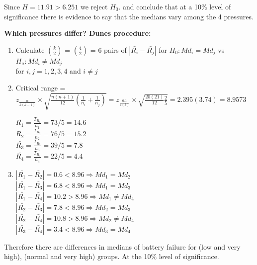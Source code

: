 \documentclass{article}
\begin{document}
\begin{enumerate}[1.]
Since $H = 11.91 > 6.251$ we reject $H_0$. and conclude that at a 10\% level of significance there is evidence to say that the medians vary among the 4 pressures.

\textbf{Which pressures differ? Dunes procedure:}

\begin{enumerate}[1)]
\item
Calculate $k \choose 2$ = $4 \choose 2$ = 6 pairs of $|\bar{R_i} - \bar{R_j}|$ for $H_0: Md_i = Md_j$ vs $H_a: Md_i \neq Md_j$ \\
for $i,j = 1,2,3,4$ and $i \neq j$

\item 
Critical range = $z_{\frac{\alpha}{k(k-1)}} \times \sqrt{ \frac{n(n+1)}{12}( \frac{1}{n_i} + \frac{1}{n_j} )} = z_{\frac{0.1}{4(3)}} \times \sqrt{ \frac{20(21)}{12}\frac{2}{5}} = 2.395(3.74) = 8.9573$

$\bar{R_1} = \frac{T_{R_1}}{n_1} = 73/5 = 14.6$ \\
$\bar{R_2} = \frac{T_{R_2}}{n_2} = 76/5 = 15.2$ \\
$\bar{R_3} = \frac{T_{R_3}}{n_3} = 39/5 = 7.8$ \\ 
$\bar{R_4} = \frac{T_{R_4}}{n_4} = 22/5 = 4.4$\\ 

\item
$|\bar{R_1} - \bar{R_2}| = 0.6 < 8.96 \Rightarrow Md_1 = Md_2$ \\
$|\bar{R_1} - \bar{R_3}| = 6.8 < 8.96 \Rightarrow Md_1 = Md_3$ \\
$|\bar{R_1} - \bar{R_4}| = 10.2 > 8.96 \Rightarrow Md_1 \neq Md_4$ \\

$|\bar{R_2} - \bar{R_3}| = 7.8 < 8.96 \Rightarrow Md_2 = Md_3$ \\
$|\bar{R_2} - \bar{R_4}| = 10.8 > 8.96 \Rightarrow Md_2 \neq Md_4$ \\

$|\bar{R_3} - \bar{R_4}| = 3.4 < 8.96 \Rightarrow Md_3 = Md_4$ \\

\end{enumerate}

Therefore there are differences in medians of battery failure for (low and very high), (normal and very high) groups. At the 10\% level of significance. 



\end{enumerate}
\end{document}
